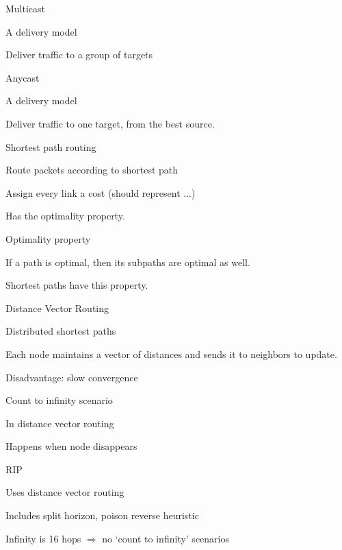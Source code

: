 \documentclass[main.tex]{subfiles}
\begin{document}
\begin{card}{Multicast}
\item A delivery model
\item Deliver traffic to a group of targets
\end{card}

\begin{card}{Anycast}
\item A delivery model
\item Deliver traffic to one target, from the best source.
\end{card}


\begin{card}{Shortest path routing}
\item Route packets according to shortest path
\item Assign every link a cost (should represent ...)
\item Has the optimality property.
\end{card}

\begin{card}{Optimality property}
\item If a path is optimal, then its subpaths are optimal as well.
\item Shortest paths have this property.
\end{card}

\begin{card}{Distance Vector Routing}
\item Distributed shortest paths
\item Each node maintains a vector of distances and sends it to neighbors to update.
\item Disadvantage: slow convergence
\end{card}

\begin{card}{Count to infinity scenario}
\item In distance vector routing
\item Happens when node disappears
\end{card}

\begin{card}{RIP}
\item Uses distance vector routing
\item Includes split horizon, poison reverse heuristic
\item Infinity is 16 hops $\Rightarrow$ no `count to infinity' scenarios
\end{card}
\end{document}
